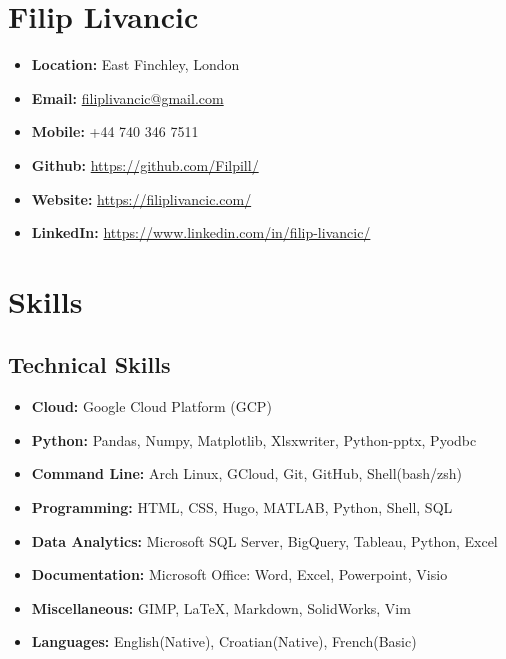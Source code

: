 \documentclass[a4paper,9pt]{article}
\date{}
\begin{document}
\section*{Filip Livancic}

\begin{itemize}[noitemsep]
    \item\textbf{Location: }East Finchley, London
    \item\textbf{Email: }\href{mailto:filiplivancic@gmail.com}{filiplivancic@gmail.com}
    \item\textbf{Mobile: }+44 740 346 7511
    \item\textbf{Github: }\url{https://github.com/Filpill/}
    \item\textbf{Website: }\url{https://filiplivancic.com/}
    \item\textbf{LinkedIn: }\url{https://www.linkedin.com/in/filip-livancic/}
\end{itemize}


\section*{Skills}
\subsection*{Technical Skills}
\begin{itemize}[noitemsep]
    \item \textbf{Cloud:} \hspace{17mm} Google Cloud Platform (GCP)
	\item \textbf{Python:} \hspace{14.8mm} Pandas, Numpy, Matplotlib, Xlsxwriter, Python-pptx, Pyodbc
	\item \textbf{Command Line:} \hspace{0.5mm} Arch Linux, GCloud, Git, GitHub, Shell(bash/zsh)
	\item \textbf{Programming:} \hspace{3.3mm} HTML, CSS, Hugo, MATLAB, Python, Shell, SQL
	\item \textbf{Data Analytics:} \hspace{1mm} Microsoft SQL Server, BigQuery, Tableau, Python, Excel
    \item \textbf{Documentation:} \hspace{0.5mm} Microsoft Office: Word, Excel, Powerpoint, Visio
	\item \textbf{Miscellaneous:} \hspace{3.3mm} GIMP, LaTeX, Markdown, SolidWorks, Vim
	\item \textbf{Languages:} \hspace{9.3mm} English(Native), Croatian(Native), French(Basic)
\end{itemize}
\end{document}

